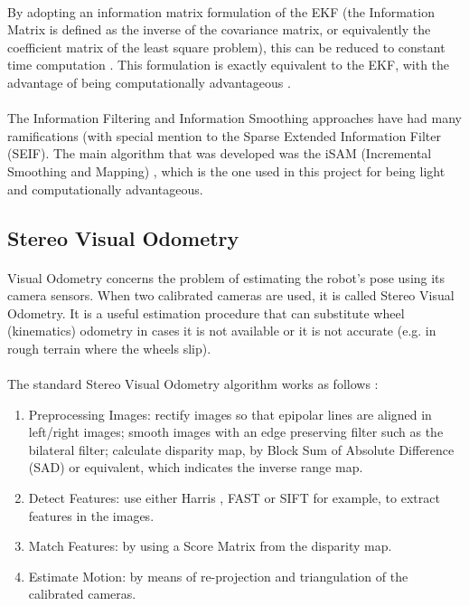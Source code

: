 \documentclass[11pt]{article}
\begin{document}
	\paragraph{}
	By adopting an information matrix formulation of the EKF (the Information Matrix is defined as the inverse of the covariance matrix, or equivalently the coefficient matrix of the least square problem), this can be reduced to constant time computation \cite{doi:10.1117/12.381658}. This formulation is exactly equivalent to the EKF, with the advantage of being computationally advantageous \cite{Dellaert-2006-9639}.
	
	\paragraph{}
	The Information Filtering and Information Smoothing approaches have had many ramifications (with special mention to the Sparse Extended Information Filter (SEIF)\cite{doi:10.1117/12.381658}. The main algorithm that was developed was the iSAM (Incremental Smoothing and Mapping) \cite{Kaess08tro}, which is the one used in this project for being light and computationally advantageous.	
	
	\subsection{Stereo Visual Odometry}
	\paragraph{}
	Visual Odometry concerns the problem of estimating the robot's pose using its camera sensors. When two calibrated cameras are used, it is called Stereo Visual Odometry. It is a useful estimation procedure that can substitute wheel (kinematics) odometry in cases it is not available or it is not accurate (e.g. in rough terrain where the wheels slip).
	
	\paragraph{}
	The standard Stereo Visual Odometry algorithm works as follows \cite{StereoVis1}:
	\begin{enumerate}[leftmargin=.8in]
	\item Preprocessing Images: rectify images so that epipolar lines are aligned in left/right images; smooth images with an edge preserving filter such as the bilateral filter; calculate disparity map, by Block Sum of Absolute Difference (SAD) or equivalent, which indicates the inverse range map.
	\item Detect Features: use either Harris \cite{Harris}, FAST \cite{FAST} or  SIFT \cite{SIFT} for example, to extract features in the images.
	\item Match Features: by using a Score Matrix from the disparity map.
	\item Estimate Motion: by means of re-projection and triangulation of the calibrated cameras.
	\end{enumerate}
	
\end{document}
